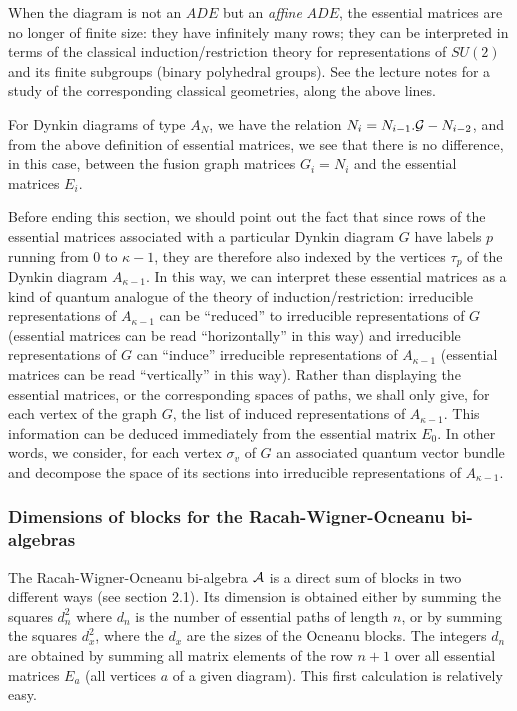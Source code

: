 \documentclass[a4paper,11pt]{article}
\begin{document}
When the diagram is not an $ADE$ but an {\sl affine} $ADE$, the
essential matrices are no longer of finite size: they have infinitely
many rows; they can be interpreted in terms of the classical
induction/restriction theory for representations of $SU(2)$ and
its finite subgroups (binary polyhedral groups). See the lecture notes
\cite{Coque:Karpacz} for a study of the corresponding classical geometries,
along the above lines.


For Dynkin diagrams of type $A_N$, we have the relation
$N_i =  N_{i-1}.{\cal G} - N_{i-2}$,
and from the above definition of essential matrices, we see that
there is no difference, in this case, between the
fusion graph matrices $G_{i} = N_i$ and the essential matrices $E_i$.


Before ending this section, we should point out the fact that since
rows of the essential
matrices associated with a particular Dynkin diagram $G$ have labels
$p$ running
from $0$ to $\kappa-1$, they are therefore also indexed by the
vertices $\tau_p$
of the Dynkin diagram $A_{\kappa - 1}$. In this way, we can interpret these
essential
matrices as a kind of quantum analogue of the theory of induction/restriction:
irreducible representations of $A_{\kappa - 1}$ can be ``reduced'' to
irreducible
representations
of $G$ (essential matrices can be read ``horizontally'' in this way) and
irreducible representations of $G$ can ``induce'' irreducible
representations of
$A_{\kappa - 1}$
       (essential matrices can be read ``vertically'' in this way).
Rather than displaying the essential matrices, or the corresponding
spaces of paths,
we shall only give, for each vertex of the graph $G$, the list of induced
representations of $A_{\kappa - 1}$.
This information can be deduced immediately from the essential matrix
$E_0$. In other
words,
we consider, for  each vertex $\sigma_v$ of $G$  an associated quantum vector
bundle
and decompose the space of its sections into irreducible representations
of $A_{\kappa
- 1}$.

\subsubsection{Dimensions of blocks for the  Racah-Wigner-Ocneanu
bi-algebras}
The Racah-Wigner-Ocneanu  bi-algebra ${\cal A}$ is a direct sum of
blocks in two different ways (see section 2.1). Its dimension
is obtained either by
summing the squares $d_n^2$ where $d_n$ is the number of essential
paths of length
$n$, or by summing the squares $d_{x}^{2}$, where the $d_{x}$ are
the sizes of the Ocneanu blocks.
The integers $d_{n}$ are obtained by summing all matrix elements of
the row $n+1$
over all essential matrices $E_{a}$ (all vertices $a$ of a given diagram).
This first calculation is relatively easy.
\end{document}
